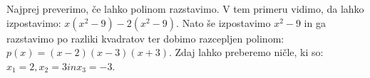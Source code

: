 \begin{preodgovor}\preodgovorparams 
 Najprej preverimo, če lahko polinom razstavimo. V tem primeru vidimo, da lahko izpostavimo: $x(x^2-9) - 2(x^2-9)$. Nato še izpostavimo $x^2-9$ in ga razstavimo po razliki kvadratov ter dobimo razcepljen polinom:
$p(x) = (x-2)(x-3)(x+3)$. Zdaj lahko preberemo ničle, ki so: $x_1=2, x_2=3 in x_3=-3$.
  
\end{preodgovor}
